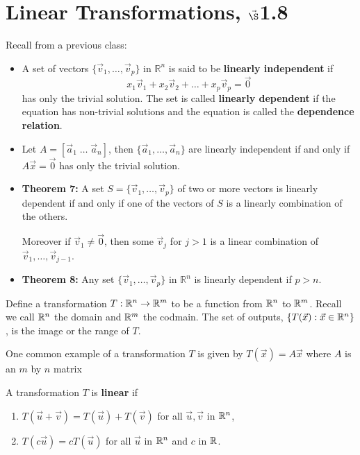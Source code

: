 


%


\section{{Linear Transformations,  $\vec\S$1.8}}%
% 

%
\thispagestyle{fancy}

Recall from a previous class:

\begin{itemize}

\item A set of vectors $\{ \vec{v}_1, \dots, \vec{v}_p\}$ in $\mathbb{R}^n$ is said to be {\bf linearly independent} if $$x_1 \vec{v}_1 +x_2 \vec{v}_2 +\dots +x_p \vec{v}_p = \vec{0}$$ has only the trivial solution. The set is called {\bf linearly dependent} if the equation has non-trivial solutions and the equation is called the {\bf dependence relation}.
\item Let $A= [\vec{a}_1 \; \dots \; \vec{a}_n ]$, then $\{ \vec{a}_1 ,  \dots , \vec{a}_n \}$ are linearly independent if and only if $A \vec{x} = \vec{0}$ has only the trivial solution.
\item {\bf Theorem 7:} A set $S=\{ \vec{v}_1, \dots, \vec{v}_p \}$ of two or more vectors is linearly dependent if and only if one of the vectors of $S$ is a linearly combination of the others.

Moreover if $\vec{v}_1\neq \vec{0}$, then some $\vec{v}_j$ for $j>1$ is a linear combination of $\vec{v}_1, \dots, \vec{v}_{j-1}$.
\item {\bf Theorem 8:} Any set $\{ \vec{v}_1, \dots, \vec{v}_p \}$ in $\mathbb{R}^n$ is linearly dependent if $p>n$.
\end{itemize}

\newpage

Define a transformation $T : \mathbb{R}^n \to \mathbb{R}^m$ to be a function from $\mathbb{R}^n$ to $\mathbb{R}^m$.   Recall we call $\mathbb{R}^n$ the domain and $\mathbb{R}^m$ the codmain. The set of outputs, $\{T(\vec{x}):\vec{x}\in \mathbb{R}^n\}$, is the image or the range of $T$.

One common example of a transformation $T$ is given by $T(\vec{x})=A\vec{x}$ where $A$ is an $m$ by $n$ matrix

\begin{defn}
A transformation $T$ is {\bf linear} if 
\begin{enumerate}
	\item $T(\vec{u}+\vec{v})=T(\vec{u})+T(\vec{v})$ for all $\vec{u},\vec{v}$ in $\mathbb{R}^n$,
	\item $T(c\vec{u})=cT(\vec{u})$ for all $\vec{u}$ in $\mathbb{R}^n$ and $c$ in $\mathbb{R}$.
\end{enumerate}
\end{defn}

